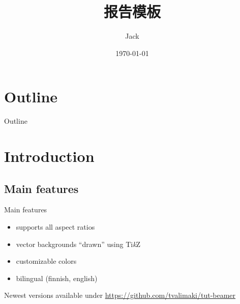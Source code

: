 \documentclass[aspectratio=169]{beamer}
\title{报告模板}
\author{Jack}
\institute{College of Information \& Engineering}
\date{\today}
\begin{document}
\maketitle

\section*{Outline}
\begin{frame}{Outline}
	\tableofcontents
\end{frame}

\section{Introduction}
\subsection{Main features}
\begin{frame}{Main features}
  \begin{itemize}
    \item supports all aspect ratios
    \item vector backgrounds ``drawn'' using Ti\emph{k}Z
    \item customizable colors
    \item bilingual (finnish, english)
  \end{itemize}
  \bigskip
  Newest versions available under \url{https://github.com/tvalimaki/tut-beamer}
\end{frame}

\end{document}
